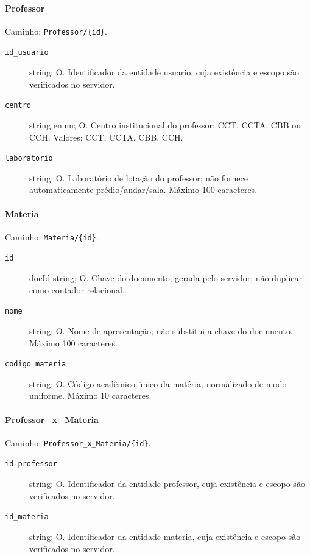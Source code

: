 \paragraph{Professor}\mbox{}\par
Caminho: \texttt{Professor/\{id\}}.
\begin{description}
\item[\texttt{id\_usuario}] string; O. Identificador da entidade usuario, cuja existência e escopo são verificados no servidor.
\item[\texttt{centro}] string enum; O. Centro institucional do professor: CCT, CCTA, CBB ou CCH. Valores: CCT, CCTA, CBB, CCH.
\item[\texttt{laboratorio}] string; O. Laboratório de lotação do professor; não fornece automaticamente prédio/andar/sala. Máximo 100 caracteres.
\end{description}

\paragraph{Materia}\mbox{}\par
Caminho: \texttt{Materia/\{id\}}.
\begin{description}
\item[\texttt{id}] docId string; O. Chave do documento, gerada pelo servidor; não duplicar como contador relacional.
\item[\texttt{nome}] string; O. Nome de apresentação; não substitui a chave do documento. Máximo 100 caracteres.
\item[\texttt{codigo\_materia}] string; O. Código acadêmico único da matéria, normalizado de modo uniforme. Máximo 10 caracteres.
\end{description}

\paragraph{Professor\_x\_Materia}\mbox{}\par
Caminho: \texttt{Professor\_x\_Materia/\{id\}}.
\begin{description}
\item[\texttt{id\_professor}] string; O. Identificador da entidade professor, cuja existência e escopo são verificados no servidor.
\item[\texttt{id\_materia}] string; O. Identificador da entidade materia, cuja existência e escopo são verificados no servidor.
\end{description}

